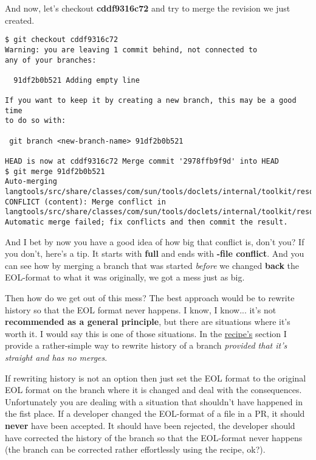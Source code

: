 And now, let's checkout {\bf cddf9316c72} and try to merge the revision we just created.

\begin{lstlisting}[style=console_style,
	basicstyle=\small,
	caption={\bf example 17} - current history]
$ git checkout cddf9316c72
Warning: you are leaving 1 commit behind, not connected to
any of your branches:

  91df2b0b521 Adding empty line

If you want to keep it by creating a new branch, this may be a good time
to do so with:

 git branch <new-branch-name> 91df2b0b521

HEAD is now at cddf9316c72 Merge commit '2978ffb9f9d' into HEAD
$ git merge 91df2b0b521
Auto-merging langtools/src/share/classes/com/sun/tools/doclets/internal/toolkit/resources/doclet.xml
CONFLICT (content): Merge conflict in langtools/src/share/classes/com/sun/tools/doclets/internal/toolkit/resources/doclet.xml
Automatic merge failed; fix conflicts and then commit the result.
\end{lstlisting}

And I bet by now you have a good idea of how big that conflict is, don't you? If you don't, here's a tip. It starts with
{\bf full} and ends with {\bf -file conflict}. And you can see how by merging a branch that was started {\it before} we
changed {\bf back} the EOL-format to what it was originally, we got a mess just as big.

Then how do we get out of this mess? The best approach would be to rewrite history so that the EOL format never happens.
I know, I know... it's not {\bf recommended as a general principle}, but there are situations where it's worth it. I would
say this is one of those situations. In the \hyperref[recipes]{recipe's} section I provide a rather-simple way to rewrite history
of a branch {\it provided that it's straight and has no merges}.

If rewriting history is not an option then just set the EOL format to the original EOL format on the branch where it is changed
and deal with the consequences. Unfortunately you are dealing with a situation that shouldn't have happened in the fist place.
If a developer changed the EOL-format of a file in a PR, it should {\bf never} have been accepted. It should have been rejected,
the developer should have corrected the history of the branch so that the EOL-format never happens (the branch can be corrected
rather effortlessly using the recipe, ok?).

